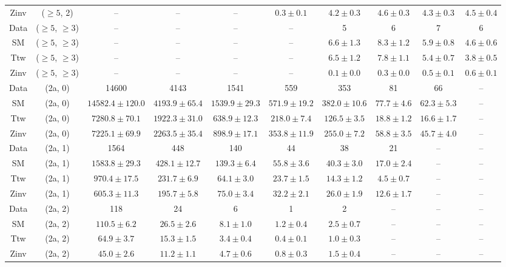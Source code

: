 \begin{table}[h!]
{\begin{tabular}{cccccccccc}
	Zinv & ($\ge5$, 2) & -- & -- & -- & $0.3\pm 0.1$ & $4.2\pm 0.3$ & $4.6\pm 0.3$ & $4.3\pm 0.3$ & $4.5\pm 0.4$ \\[0.5ex] 
	Data & ($\ge5$, $\ge3$) & -- & -- & -- & -- & 5 & 6 & 7 & 6 \\[0.5ex] 
	SM & ($\ge5$, $\ge3$) & -- & -- & -- & -- & $6.6\pm 1.3$ & $8.3\pm 1.2$ & $5.9\pm 0.8$ & $4.6\pm 0.6$ \\[0.5ex] 
	Ttw & ($\ge5$, $\ge3$) & -- & -- & -- & -- & $6.5\pm 1.2$ & $7.8\pm 1.1$ & $5.4\pm 0.7$ & $3.8\pm 0.5$ \\[0.5ex] 
	Zinv & ($\ge5$, $\ge3$) & -- & -- & -- & -- & $0.1\pm 0.0$ & $0.3\pm 0.0$ & $0.5\pm 0.1$ & $0.6\pm 0.1$ \\[0.5ex] 
	Data & (2a, 0) & 14600 & 4143 & 1541 & 559 & 353 & 81 & 66 & -- \\[0.5ex] 
	SM & (2a, 0) & $14582.4\pm 120.0$ & $4193.9\pm 65.4$ & $1539.9\pm 29.3$ & $571.9\pm 19.2$ & $382.0\pm 10.6$ & $77.7\pm 4.6$ & $62.3\pm 5.3$ & -- \\[0.5ex] 
	Ttw & (2a, 0) & $7280.8\pm 70.1$ & $1922.3\pm 31.0$ & $638.9\pm 12.3$ & $218.0\pm 7.4$ & $126.5\pm 3.5$ & $18.8\pm 1.2$ & $16.6\pm 1.7$ & -- \\[0.5ex] 
	Zinv & (2a, 0) & $7225.1\pm 69.9$ & $2263.5\pm 35.4$ & $898.9\pm 17.1$ & $353.8\pm 11.9$ & $255.0\pm 7.2$ & $58.8\pm 3.5$ & $45.7\pm 4.0$ & -- \\[0.5ex] 
	Data & (2a, 1) & 1564 & 448 & 140 & 44 & 38 & 21 & -- & -- \\[0.5ex] 
	SM & (2a, 1) & $1583.8\pm 29.3$ & $428.1\pm 12.7$ & $139.3\pm 6.4$ & $55.8\pm 3.6$ & $40.3\pm 3.0$ & $17.0\pm 2.4$ & -- & -- \\[0.5ex] 
	Ttw & (2a, 1) & $970.4\pm 17.5$ & $231.7\pm 6.9$ & $64.1\pm 3.0$ & $23.7\pm 1.5$ & $14.3\pm 1.2$ & $4.5\pm 0.7$ & -- & -- \\[0.5ex] 
	Zinv & (2a, 1) & $605.3\pm 11.3$ & $195.7\pm 5.8$ & $75.0\pm 3.4$ & $32.2\pm 2.1$ & $26.0\pm 1.9$ & $12.6\pm 1.7$ & -- & -- \\[0.5ex] 
	Data & (2a, 2) & 118 & 24 & 6 & 1 & 2 & -- & -- & -- \\[0.5ex] 
	SM & (2a, 2) & $110.5\pm 6.2$ & $26.5\pm 2.6$ & $8.1\pm 1.0$ & $1.2\pm 0.4$ & $2.5\pm 0.7$ & -- & -- & -- \\[0.5ex] 
	Ttw & (2a, 2) & $64.9\pm 3.7$ & $15.3\pm 1.5$ & $3.4\pm 0.4$ & $0.4\pm 0.1$ & $1.0\pm 0.3$ & -- & -- & -- \\[0.5ex] 
	Zinv & (2a, 2) & $45.0\pm 2.6$ & $11.2\pm 1.1$ & $4.7\pm 0.6$ & $0.8\pm 0.3$ & $1.5\pm 0.4$ & -- & -- & -- \\[0.5ex] 

\end{tabular}}
\end{table}
